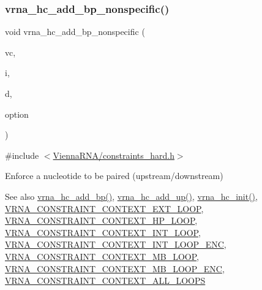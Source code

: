 \subsubsection{\texorpdfstring{vrna\+\_\+hc\+\_\+add\+\_\+bp\+\_\+nonspecific()}{vrna\_hc\_add\_bp\_nonspecific()}}
{\footnotesize\ttfamily void vrna\+\_\+hc\+\_\+add\+\_\+bp\+\_\+nonspecific (\begin{DoxyParamCaption}\item[{\hyperlink{group__fold__compound_ga1b0cef17fd40466cef5968eaeeff6166}{vrna\+\_\+fold\+\_\+compound\+\_\+t} $\ast$}]{vc,  }\item[{int}]{i,  }\item[{int}]{d,  }\item[{unsigned char}]{option }\end{DoxyParamCaption})}



{\ttfamily \#include $<$\hyperlink{constraints__hard_8h}{Vienna\+R\+N\+A/constraints\+\_\+hard.\+h}$>$}



Enforce a nucleotide to be paired (upstream/downstream) 

\begin{DoxySeeAlso}{See also}
\hyperlink{group__hard__constraints_ga7cba95ebe2ceb5ec9a5768f2232854fd}{vrna\+\_\+hc\+\_\+add\+\_\+bp()}, \hyperlink{group__hard__constraints_ga447d88e06ad97bb225cd83310ace8345}{vrna\+\_\+hc\+\_\+add\+\_\+up()}, \hyperlink{group__hard__constraints_ga36ff456c43bf920629cee5a236e4f0ff}{vrna\+\_\+hc\+\_\+init()}, \hyperlink{group__hard__constraints_ga9418eda62a5dec070896702c279d2548}{V\+R\+N\+A\+\_\+\+C\+O\+N\+S\+T\+R\+A\+I\+N\+T\+\_\+\+C\+O\+N\+T\+E\+X\+T\+\_\+\+E\+X\+T\+\_\+\+L\+O\+OP}, \hyperlink{group__hard__constraints_ga79203702b197b6b9d3b78eed40663eb1}{V\+R\+N\+A\+\_\+\+C\+O\+N\+S\+T\+R\+A\+I\+N\+T\+\_\+\+C\+O\+N\+T\+E\+X\+T\+\_\+\+H\+P\+\_\+\+L\+O\+OP}, \hyperlink{group__hard__constraints_ga21feeab3a9e5fa5a9e3d9ac0fcf5994f}{V\+R\+N\+A\+\_\+\+C\+O\+N\+S\+T\+R\+A\+I\+N\+T\+\_\+\+C\+O\+N\+T\+E\+X\+T\+\_\+\+I\+N\+T\+\_\+\+L\+O\+OP}, \hyperlink{group__hard__constraints_ga0536288e04ff6332ecdc23ca4705402b}{V\+R\+N\+A\+\_\+\+C\+O\+N\+S\+T\+R\+A\+I\+N\+T\+\_\+\+C\+O\+N\+T\+E\+X\+T\+\_\+\+I\+N\+T\+\_\+\+L\+O\+O\+P\+\_\+\+E\+NC}, \hyperlink{group__hard__constraints_ga456ecd2ff00056bb64da8dd4f61bbfc5}{V\+R\+N\+A\+\_\+\+C\+O\+N\+S\+T\+R\+A\+I\+N\+T\+\_\+\+C\+O\+N\+T\+E\+X\+T\+\_\+\+M\+B\+\_\+\+L\+O\+OP}, \hyperlink{group__hard__constraints_ga02a3d703ddbcfce393e4bbfcb9db7077}{V\+R\+N\+A\+\_\+\+C\+O\+N\+S\+T\+R\+A\+I\+N\+T\+\_\+\+C\+O\+N\+T\+E\+X\+T\+\_\+\+M\+B\+\_\+\+L\+O\+O\+P\+\_\+\+E\+NC}, \hyperlink{group__hard__constraints_ga886d9127c49bb982a4b67cd7581e8a5a}{V\+R\+N\+A\+\_\+\+C\+O\+N\+S\+T\+R\+A\+I\+N\+T\+\_\+\+C\+O\+N\+T\+E\+X\+T\+\_\+\+A\+L\+L\+\_\+\+L\+O\+O\+PS}
\end{DoxySeeAlso}

